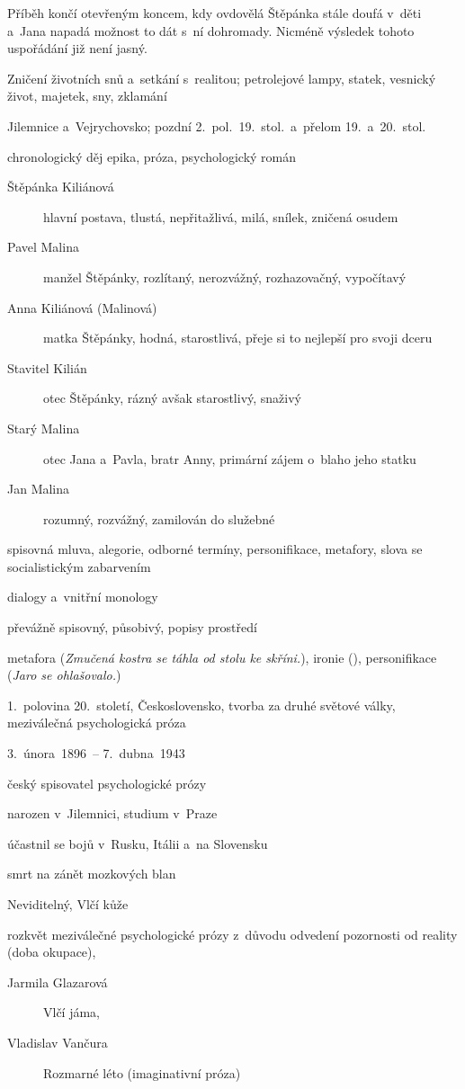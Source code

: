 {Příběh končí otevřeným koncem, kdy ovdovělá Štěpánka stále doufá v~děti a~Jana
napadá možnost to dát s~ní dohromady. Nicméně výsledek tohoto uspořádání již
není jasný.

 Zničení životních snů a~setkání s~realitou; petrolejové
lampy, statek, vesnický život, majetek, sny, zklamání

 Jilemnice a~Vejrychovsko; pozdní 2.~pol.~19.~stol.~a~přelom
19.~a~20.~stol.

 chronologický děj
 epika, próza, psychologický román

\newpart

\begin{description}
	\item[Štěpánka Kiliánová] hlavní postava, tlustá, nepřitažlivá, milá,
		snílek, zničená osudem
	\item[Pavel Malina] manžel Štěpánky, rozlítaný, nerozvážný, rozhazovačný,
		vypočítavý
	\item[Anna Kiliánová (Malinová)] matka Štěpánky, hodná, starostlivá, přeje
		si to nejlepší pro svoji dceru
	\item[Stavitel Kilián] otec Štěpánky, rázný avšak starostlivý, snaživý
	\item[Starý Malina] otec Jana a~Pavla, bratr Anny, primární zájem o~blaho
		jeho statku
	\item[Jan Malina] rozumný, rozvážný, zamilován do služebné
\end{description}

spisovná mluva, alegorie, odborné termíny, personifikace, metafory,
slova se socialistickým zabarvením

 dialogy a~vnitřní monology

\newpart

převážně spisovný, působivý, popisy prostředí

 metafora (\textit{Zmučená kostra se
táhla od stolu ke skříni.}), ironie (\textit{}), personifikace (\textit{Jaro se ohlašovalo.})

 1.~polovina 20.~století, Československo, tvorba
za druhé světové války, meziválečná psychologická próza

\begin{compactitem}
	\item 3.~února~1896~-- 7.~dubna~1943
	\item český spisovatel psychologické prózy
	\item narozen v~Jilemnici, studium v~Praze
	\item účastnil se bojů v~Rusku, Itálii a~na Slovensku
	\item smrt na zánět mozkových blan
	\item Neviditelný, Vlčí kůže
\end{compactitem}

rozkvět meziválečné psychologické prózy z~důvodu odvedení pozornosti od reality (doba okupace),
\begin{description}
	\item[Jarmila Glazarová] Vlčí jáma,
	\item[Vladislav Vančura] Rozmarné léto (imaginativní próza)
\end{description}
}
